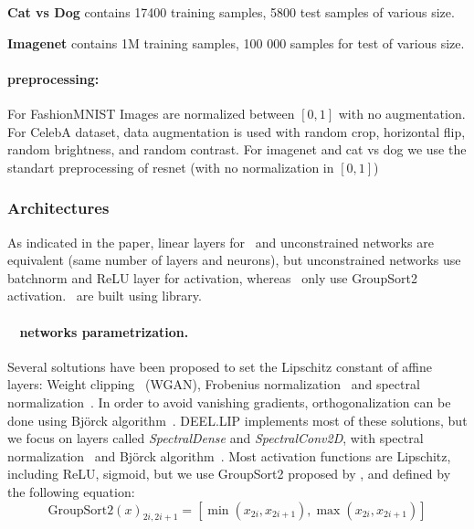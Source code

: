 \textbf{Cat vs Dog} contains 17400 training samples, 5800 test samples of various size. 

\textbf{Imagenet} contains 1M training samples, 100 000 samples for test of various size. 

\paragraph*{preprocessing:}
For FashionMNIST Images are normalized between $[0,1]$ with no augmentation. For CelebA dataset, data augmentation is used with random crop, horizontal flip, random brightness, and random contrast. For imagenet and cat vs dog we use the standart preprocessing of resnet (with no normalization in  $[0,1]$)




\subsubsection{Architectures}
As indicated in the paper, linear layers for \otnn~and unconstrained networks are equivalent (same number of layers and neurons), but unconstrained networks use batchnorm and ReLU layer for activation, whereas \otnn~only use GroupSort2~\cite{pmlr-v97-anil19a,serrurier2021achieving} activation. \otnn~are built using \Deellip library.


    \paragraph*{\onlyonelip~ networks parametrization.} Several soltutions have been proposed to set the Lipschitz constant of affine layers: Weight clipping~\cite{Arjovsky2017} (WGAN), Frobenius normalization~\cite{SalimansK16} and spectral normalization~\cite{Miyato2018SpectralNF}. In order to avoid  vanishing gradients, orthogonalization can be done using Bj{\"o}rck algorithm~\cite{bjorck71Ortho}. DEEL.LIP implements most of these solutions, but we focus on layers called \textit{SpectralDense} and \textit{SpectralConv2D}, with  spectral normalization~\cite{Miyato2018SpectralNF} and  Bj{\"o}rck algorithm~\cite{bjorck71Ortho}.
    Most activation functions are Lipschitz, including ReLU, sigmoid, but we use GroupSort2 proposed by \cite{pmlr-v97-anil19a}, and defined by the following equation:
    $$\text{GroupSort2}(x)_{2i,2i+1}=[\min{(x_{2i},x_{2i+1})},\max{(x_{2i},x_{2i+1})}]$$

